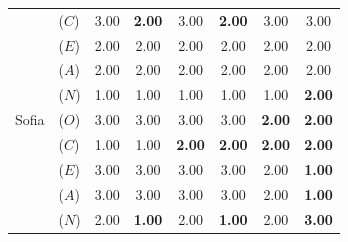 \begin{table}[t]
\begin{tabular}{llcccccc}
      & ($C$) & 3.00 & \textbf{2.00} & 3.00 & \textbf{2.00} & 3.00 & 3.00 \\
      & ($E$) & 2.00 & 2.00 & 2.00 & 2.00 & 2.00 & 2.00 \\
      & ($A$) & 2.00 & 2.00 & 2.00 & 2.00 & 2.00 & 2.00 \\
      & ($N$) & 1.00 & 1.00 & 1.00 & 1.00 & 1.00 & \textbf{2.00} \\
\addlinespace
Sofia & ($O$) & 3.00 & 3.00 & 3.00 & 3.00 & \textbf{2.00} & \textbf{2.00} \\
      & ($C$) & 1.00 & 1.00 & \textbf{2.00} & \textbf{2.00} & \textbf{2.00} & \textbf{2.00} \\
      & ($E$) & 3.00 & 3.00 & 3.00 & 3.00 & 2.00 & \textbf{1.00} \\
      & ($A$) & 3.00 & 3.00 & 3.00 & 3.00 & 2.00 & \textbf{1.00} \\
      & ($N$) & 2.00 & \textbf{1.00} & 2.00 & \textbf{1.00} & 2.00 & \textbf{3.00} \\
\bottomrule
\end{tabular}
\end{table}
